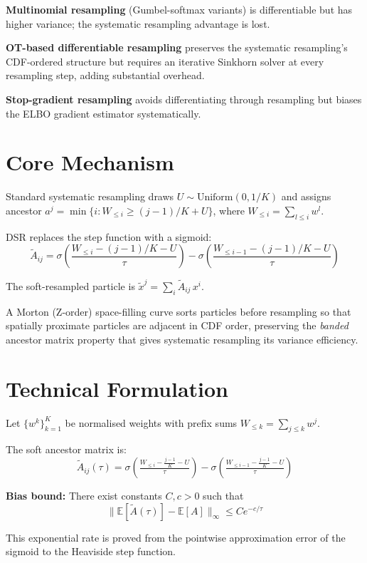 \documentclass[10pt,twocolumn]{article}
\begin{document}
\textbf{Multinomial resampling} (Gumbel-softmax variants) is differentiable
but has higher variance; the systematic resampling advantage is lost.

\textbf{OT-based differentiable resampling} preserves the systematic
resampling's CDF-ordered structure but requires an iterative Sinkhorn solver
at every resampling step, adding substantial overhead.

\textbf{Stop-gradient resampling} avoids differentiating through resampling
but biases the ELBO gradient estimator systematically.

\section{Core Mechanism}

Standard systematic resampling draws $U \sim \text{Uniform}(0,1/K)$ and
assigns ancestor $a^j = \min\{i: W_{\leq i} \geq (j-1)/K + U\}$, where
$W_{\leq i} = \sum_{l \leq i} w^l$.

DSR replaces the step function with a sigmoid:
\[
\tilde{A}_{ij} = \sigma\!\left(\frac{W_{\leq i} - (j-1)/K - U}{\tau}\right)
- \sigma\!\left(\frac{W_{\leq i-1} - (j-1)/K - U}{\tau}\right)
\]

The soft-resampled particle is $\tilde{x}^j = \sum_i \tilde{A}_{ij}\,x^i$.

A Morton (Z-order) space-filling curve sorts particles before resampling
so that spatially proximate particles are adjacent in CDF order, preserving
the \emph{banded} ancestor matrix property that gives systematic resampling
its variance efficiency.

\section{Technical Formulation}

Let $\{w^k\}_{k=1}^K$ be normalised weights with prefix sums
$W_{\leq k} = \sum_{j \leq k} w^j$.

The soft ancestor matrix is:
\[
\tilde{A}_{ij}(\tau) = \sigma\!\left(\tfrac{W_{\leq i} - \frac{j-1}{K} - U}{\tau}\right)
- \sigma\!\left(\tfrac{W_{\leq i-1} - \frac{j-1}{K} - U}{\tau}\right)
\]

\textbf{Bias bound:} There exist constants $C, c > 0$ such that
\[
\|\mathbb{E}[\tilde{A}(\tau)] - \mathbb{E}[A]\|_\infty \leq C e^{-c/\tau}
\]

This exponential rate is proved from the pointwise approximation error
of the sigmoid to the Heaviside step function.
\end{document}
